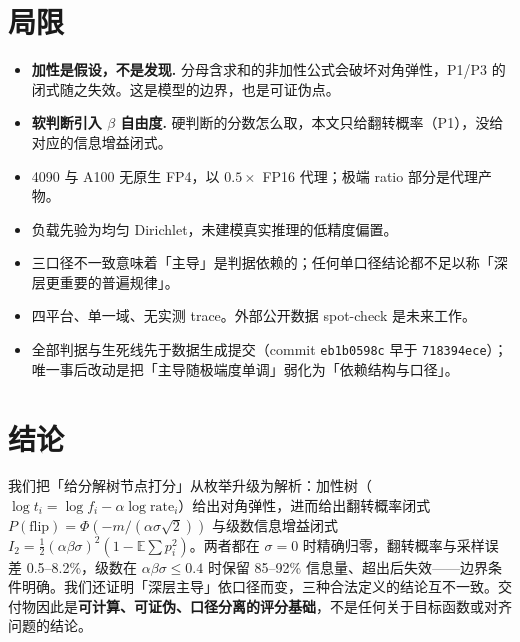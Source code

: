 \documentclass[12pt]{ctexart}
\newcommand{\E}{\mathbb{E}}
\newcommand{\rate}{\mathrm{rate}}
\newcommand{\flip}{\mathrm{flip}}
\begin{document}
\begin{table}[htbp]
\centering\small
{}
\end{table}

\section{局限}
\begin{itemize}
  \item \textbf{加性是假设，不是发现.} 分母含求和的非加性公式会破坏对角弹性，P1/P3 的闭式随之失效。这是模型的边界，也是可证伪点。
  \item \textbf{软判断引入 $\beta$ 自由度.} 硬判断的分数怎么取，本文只给翻转概率（P1），没给对应的信息增益闭式。
  \item 4090 与 A100 无原生 FP4，以 $0.5\times$ FP16 代理；极端 ratio 部分是代理产物。
  \item 负载先验为均匀 Dirichlet，未建模真实推理的低精度偏置。
  \item 三口径不一致意味着「主导」是判据依赖的；任何单口径结论都不足以称「深层更重要的普遍规律」。
  \item 四平台、单一域、无实测 trace。外部公开数据 spot-check 是未来工作。
  \item 全部判据与生死线先于数据生成提交（commit \texttt{eb1b0598c} 早于 \texttt{718394ece}）；唯一事后改动是把「主导随极端度单调」弱化为「依赖结构与口径」。
\end{itemize}

\section{结论}

我们把「给分解树节点打分」从枚举升级为解析：加性树（$\log t_i=\log f_i-\alpha\log\rate_i$）给出对角弹性，进而给出翻转概率闭式 $P(\flip)=\Phi(-m/(\alpha\sigma\sqrt2))$ 与级数信息增益闭式 $I_2=\tfrac12(\alpha\beta\sigma)^2(1-\E\sum p_i^2)$。两者都在 $\sigma=0$ 时精确归零，翻转概率与采样误差 0.5--8.2\%，级数在 $\alpha\beta\sigma\le0.4$ 时保留 85--92\% 信息量、超出后失效——边界条件明确。我们还证明「深层主导」依口径而变，三种合法定义的结论互不一致。交付物因此是\textbf{可计算、可证伪、口径分离的评分基础}，不是任何关于目标函数或对齐问题的结论。
\end{document}

